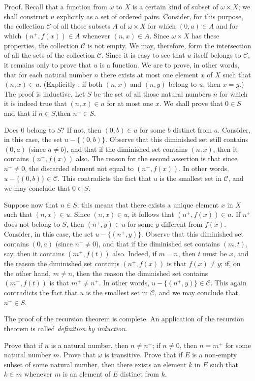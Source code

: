 Proof. Recall that a function from $\omega$ to $X$ is a certain kind of subset of $ \omega \times X$; we shall construct $u$ explicitly as a set of ordered  pairs. Consider, for this purpose, the collection $\mathcal{C}$ of all those subsets $A$ of $\omega \times X$ for which $(0, a) \in A$ and for which $(n^{+}, f(x)) \in A$ whenever $(n, x) \in A$. Since $ \omega \times X$ has these properties, the collection $\mathcal{C}$ is not empty. We may, therefore, form the intersection of all the sets of the collection $\mathcal{C}$. Since it is easy to see that $u$ itself belongs to $\mathcal{C}$, it remains only to prove that $u$ is a function. We are to prove, in other words, that for each natural number $n$ there exists at most one element $x$ of $X$ such that $(n, x) \in u$. (Explicitly : if both $(n, x)$ and $(n, y)$ belong to $u$, then $x = y$.) The proof is inductive. Let $S$ be the set of all those natural numbers $n$ for which it is indeed true that $(n, x) \in u$ for at most one $x$. We shall prove that $0 \in S$ and that if $n \in S$,then $n^{+} \in S$.

Does $0$ belong to $S$? If not, then $(0,b) \in u$ for some $b$ distinct from $a$. Consider, in this case, the set $u - \{ (0, b) \}$. Observe that this diminished set still contains $(0, a)$ (since $a \neq b$), and that if the diminished set contains $(n, x)$, then it contains $(n^{+}, f(x))$ also. The reason for the second assertion is that since $n^{+} \neq 0$, the discarded element not equal to $(n^{+}, f(x))$. In other words, $u - \{ (0, b) \} \in \mathcal{C}$. This contradicts the fact that $u$ is the smallest set in $\mathcal{C}$, and we may conclude that $0 \in S$. 

Suppose now that $n \in S$; this means that there exists a unique element $x$ in $X$ such that $(n, x) \in u$. Since $(n, x) \in u$, it follows that $(n^{+}, f(x)) \in u$. If $n^{+}$ does not belong to $S$, then $(n^{+}, y) \in u$ for some $y$ different from $f(x)$. Consider, in this case, the set $u - \{ (n^{+}, y) \}$. Observe that this diminished set contains $(0, a)$ (since $n^{+} \neq 0$), and that if the diminished set contains $(m, t)$, say, then it contains $(m^{+}, f(t))$ also. Indeed, if $m = n$, then $t$ must be $x$, and the reason the diminished set contains $(n^{+}, f(x))$ is that $f(x) \neq y$; if, on the other hand, $m \neq n$, then the reason the diminished set contains $(m^{+}, f(t))$ is that $m^{+} \neq n^{+}$. In other words, $u - \{ ( n^{+}, y) \} \in \mathcal{C}$. This again contradicts the fact that $u$ is the smallest set in $\mathcal{C}$, and we may conclude that $n^{+} \in S$. 

The proof of the recursion theorem is complete. An application of the recursion theorem is called \textit{definition by induction}. 

\begin{named}[Exercise. ] Prove that if $n$ is a natural number, then $n \neq n^{+}$; if $n \neq 0$, then $n = m^{+}$ for some natural number $m$. Prove that $ \omega $ is transitive. Prove that if $E$ is a non-empty subset of some natural number, then there exists an element $k$ in $E$ such that $k \in m$ whenever $m$ is an element of $E$ distinct from $k$.
\end{named}